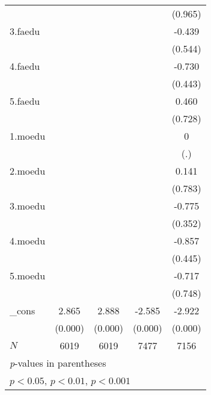 {\begin{tabular}{l*{4}{c}}
            &                     &                     &                     &     (0.965)         \\
[1em]
3.faedu     &                     &                     &                     &      -0.439         \\
            &                     &                     &                     &     (0.544)         \\
[1em]
4.faedu     &                     &                     &                     &      -0.730         \\
            &                     &                     &                     &     (0.443)         \\
[1em]
5.faedu     &                     &                     &                     &       0.460         \\
            &                     &                     &                     &     (0.728)         \\
[1em]
1.moedu     &                     &                     &                     &           0         \\
            &                     &                     &                     &         (.)         \\
[1em]
2.moedu     &                     &                     &                     &       0.141         \\
            &                     &                     &                     &     (0.783)         \\
[1em]
3.moedu     &                     &                     &                     &      -0.775         \\
            &                     &                     &                     &     (0.352)         \\
[1em]
4.moedu     &                     &                     &                     &      -0.857         \\
            &                     &                     &                     &     (0.445)         \\
[1em]
5.moedu     &                     &                     &                     &      -0.717         \\
            &                     &                     &                     &     (0.748)         \\
[1em]
\_cons      &       2.865\sym{***}&       2.888\sym{***}&      -2.585\sym{***}&      -2.922\sym{***}\\
            &     (0.000)         &     (0.000)         &     (0.000)         &     (0.000)         \\
\hline
\(N\)       &        6019         &        6019         &        7477         &        7156         \\
\hline\hline
\multicolumn{5}{l}{\footnotesize \textit{p}-values in parentheses}\\
\multicolumn{5}{l}{\footnotesize \sym{*} \(p<0.05\), \sym{**} \(p<0.01\), \sym{***} \(p<0.001\)}\\
\end{tabular}
}
